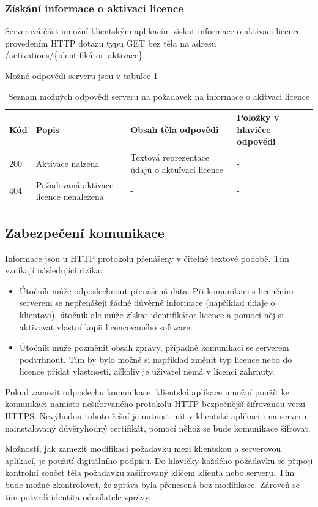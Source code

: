 \subsubsection*{Získání informace o aktivaci licence}

Serverová část umožní klientským aplikacím získat informace o aktivaci licence
provedením \gls{HTTP} dotazu typu GET bez těla na adresu
/activations/\{identifikátor~aktivace\}.

Možné odpovědi serveru jsou v tabulce \ref{tab:activation-request-responses}


\begin{table}\centering
	\caption[Results]{Seznam možných odpovědí
	serveru na požadavek na informace o akitvaci
	licence}\label{tab:activation-request-responses} \begin{tabular}{|p{1cm}|p{3cm}|p{4cm}|p{3cm}|}\hline 
	Kód		&  Popis	& Obsah těla odpovědi & Položky v hlavičce odpovědi
	\tabularnewline \hline \hline 
	200		& Aktivace nalzena	& Textová reprezentace údajů o aktuïvaci licence
	& -
	\tabularnewline \hline
	404	& Požadovaná aktivace licence nenalezena & - & -
	\tabularnewline \hline
	\end{tabular}
\end{table}

\subsection{Zabezpečení komunikace}

Informace jsou u \gls{HTTP} protokolu přenášeny v čitelné textové podobě. Tím
vznikají následující rizika:

\begin{itemize}
  \item Útočník může odposlechnout přenášená data. Při komunikaci s licenčním
  serverem se nepřenášejí žádné důvěrné informace (například údaje o klientovi),
  útočník ale může získat identifikátor licence a pomocí něj si aktivovat
  vlastní kopii licencovaného software.
  \item Útočník může pozměnit obsah zprávy, případně komunikaci se serverem
  podvrhnout. Tím by bylo možné si například změnit typ licence nebo do
  licence přidat vlastnosti, ačkoliv je uživatel nemá v licenci zahrnuty.
\end{itemize}

Pokud zamezit odposlechu komunikace, klientská aplikace umožní použít ke
komunikaci namísto nešiforvaného protokolu \gls{HTTP} bezpečnější šifrovanou
verzi \gls{HTTPS}. Nevýhodou tohoto řešní je nutnost mít v klientské aplikaci i
na serveru nainstalovaný důvěryhodný certifikát, pomocí něhož se bude komunikace
šifrovat.

Možností, jak zamezit modifikaci požadavku mezi klientskou a serverovou
aplikací, je použití digitálního podpisu. Do hlavičky každého požadavku se
připojí kontrolní součet těla požadavku zašifrovaný klíčem klienta nebo
serveru. Tím bude možné zkontrolovat, že zpráva byla přenesená bez modifikace.
Zároveň se tím potvrdí identita odesílatele zprávy.


